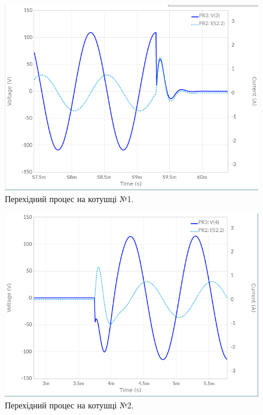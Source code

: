 \documentclass{article}
\begin{document}
\begin{normalsize}
	\begin{figure}[H]
		\centering
		\includegraphics[scale=0.5]{22}
		\caption{Перехідний процес на котушці №1.}
	\end{figure}
	
	\begin{figure}[H]
		\centering
		\includegraphics[scale=0.5]{31}
		\caption{Перехідний процес на котушці №2.}
	\end{figure}
	

\end{normalsize}
\end{document}
